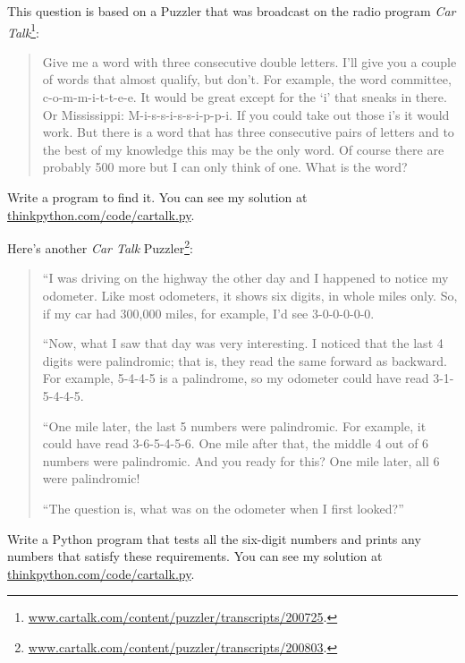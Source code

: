 \documentclass[10pt]{book}
\begin{document}
\begin{ex}


This question is based on a Puzzler that was broadcast on the radio
program {\em Car
  Talk}\footnote{\url{www.cartalk.com/content/puzzler/transcripts/200725}.}:

\begin{quote}
Give me a word with three consecutive double letters. I'll give you a
couple of words that almost qualify, but don't. For example, the word
committee, c-o-m-m-i-t-t-e-e. It would be great except for the `i' that
sneaks in there. Or Mississippi: M-i-s-s-i-s-s-i-p-p-i. If you could
take out those i's it would work. But there is a word that has three
consecutive pairs of letters and to the best of my knowledge this may
be the only word. Of course there are probably 500 more but I can only
think of one. What is the word?
\end{quote}

Write a program to find it.  You can see my solution at
\url{thinkpython.com/code/cartalk.py}.

\end{ex}


\begin{ex}
Here's another {\em Car Talk}
Puzzler\footnote{\url{www.cartalk.com/content/puzzler/transcripts/200803}.}:


\begin{quote}
``I was driving on the highway the other day and I happened to
notice my odometer. Like most odometers, it shows six digits,
in whole miles only. So, if my car had 300,000
miles, for example, I'd see 3-0-0-0-0-0.

``Now, what I saw that day was very interesting. I noticed that the
last 4 digits were palindromic; that is, they read the same forward as
backward. For example, 5-4-4-5 is a palindrome, so my odometer
could have read 3-1-5-4-4-5.

``One mile later, the last 5 numbers were palindromic. For example, it
could have read 3-6-5-4-5-6.  One mile after that, the middle 4 out of
6 numbers were palindromic.  And you ready for this? One mile later,
all 6 were palindromic!

``The question is, what was on the odometer when I first looked?''
\end{quote}

Write a Python program that tests all the six-digit numbers and prints
any numbers that satisfy these requirements.  You can see my solution
at \url{thinkpython.com/code/cartalk.py}.

\end{ex}
\end{document}

